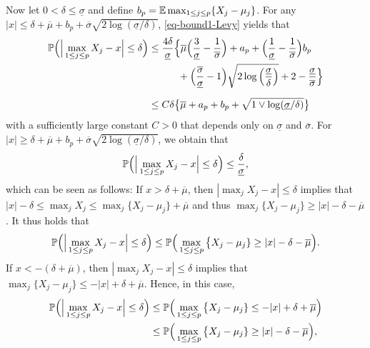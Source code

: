 Now let $0 < \delta \le \underline{\sigma}$ and define $b_p = \mathbb{E} \max_{1 \le j \le p} \{X_j - \mu_j\}$. For any $|x| \le \delta + \overline{\mu} + b_p + \overline{\sigma} \sqrt{2\log(\underline{\sigma}/\delta)}$, \eqref{eq-bound1-Levy} yields that 
\begin{align}
\pr \Big( \Big| \max_{1 \le j \le p} X_j - x \Big| \le \delta \Big) 
 & \le \frac{4 \delta}{\underline{\sigma}} \Big\{ \overline{\mu} \Big( \frac{3}{\underline{\sigma}} - \frac{1}{\overline{\sigma}} \Big) + a_p + \Big( \frac{1}{\underline{\sigma}} - \frac{1}{\overline{\sigma}} \Big) b_p \nonumber \\ & \phantom{\le \frac{4 \delta}{\underline{\sigma}} \Big\{} + \Big( \frac{\overline{\sigma}}{\underline{\sigma}} - 1 \Big) \sqrt{2\log\Big(\frac{\underline{\sigma}}{\delta}\Big)} + 2 - \frac{\underline{\sigma}}{\overline{\sigma}} \Big\} \nonumber \\[0.2cm]
 & \le C \delta \big\{ \overline{\mu} + a_p + b_p + \sqrt{1 \vee \log(\underline{\sigma}/\delta)} \big\} \label{eq-bound2-Levy}
\end{align}
with a sufficiently large constant $C > 0$ that depends only on $\underline{\sigma}$ and $\overline{\sigma}$. For $|x| \ge \delta + \overline{\mu} + b_p + \overline{\sigma}\sqrt{2\log(\underline{\sigma}/\delta)}$, we obtain that 
\begin{equation}\label{eq-bound3-Levy}
\mathbb{P} \Big( \Big| \max_{1 \le j \le p} X_j - x \Big| \le \delta \Big) \le \frac{\delta}{\underline{\sigma}}, 
\end{equation}
which can be seen as follows: If $x > \delta + \overline{\mu}$, then $|\max_j X_j - x| \le \delta$ implies that $|x| - \delta \le \max_j X_j \le \max_j \{ X_j - \mu_j \} + \overline{\mu}$ and thus $\max_j \{ X_j - \mu_j \} \ge |x| - \delta - \overline{\mu}$. It thus holds that 
\begin{equation}\label{eq-bound3-Levy-prep1}
\mathbb{P} \Big( \Big| \max_{1 \le j \le p} X_j - x \Big| \le \delta \Big) \le \mathbb{P} \Big( \max_{1 \le j \le p} \big\{ X_j - \mu_j \} \ge |x| - \delta - \overline{\mu} \Big). 
\end{equation}
If $x < - (\delta + \overline{\mu})$, then $|\max_j X_j - x| \le \delta$ implies that $\max_j \{ X_j - \mu_j \} \le -|x| + \delta + \overline{\mu}$. Hence, in this case,
\begin{align}
\mathbb{P} \Big( \Big| \max_{1 \le j \le p} X_j - x \Big| \le \delta \Big) 
 & \le \mathbb{P} \Big( \max_{1 \le j \le p} \big\{ X_j - \mu_j \} \le -|x| + \delta + \overline{\mu} \Big) \nonumber \\
 & \le \mathbb{P} \Big( \max_{1 \le j \le p} \big\{ X_j - \mu_j \} \ge |x| - \delta - \overline{\mu} \Big), \label{eq-bound3-Levy-prep2}
\end{align}
